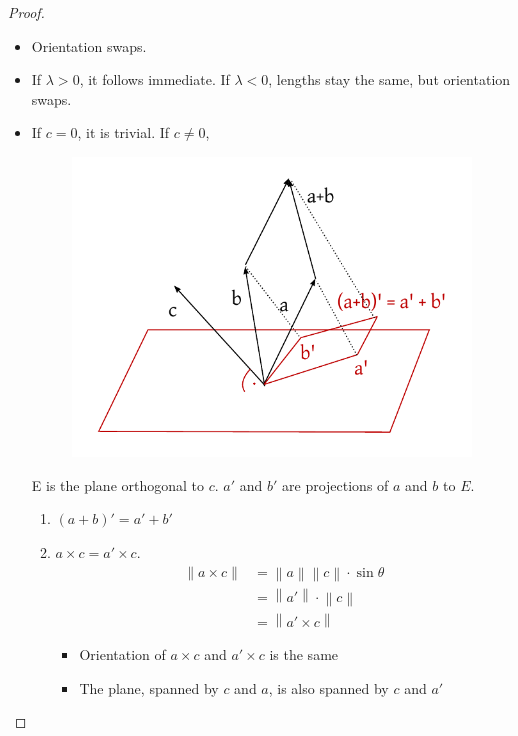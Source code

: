 \documentclass{article}
\newcommand{\norm}[1]{\left\|#1\right\|}
\begin{document}
\begin{proof}
  \begin{itemize}
    \item Orientation swaps.
    \item If $\lambda > 0$, it follows immediate.
      If $\lambda < 0$, lengths stay the same, but orientation swaps.
    \item If $c = 0$, it is trivial. If $c \neq 0$,
      \begin{figure}[!h]
        \begin{center}
          \includegraphics{img/04_apbmc_eq_amcpbmc.pdf}
        \end{center}
      \end{figure}
      E is the plane orthogonal to $c$. $a'$ and $b'$ are projections of $a$ and $b$ to $E$.

      \begin{enumerate}
        \item $(a+b)' = a' + b'$
        \item $a \times c = a' \times c$.
          \begin{align*}
            \norm{a \times c} &= \norm a \norm c \cdot \sin\theta \\
              &= \norm{a'} \cdot \norm{c} \\
              &= \norm{a' \times c}
          \end{align*}
          \begin{itemize}
            \item Orientation of $a \times c$ and $a' \times c$ is the same
            \item The plane, spanned by $c$ and $a$, is also spanned by $c$ and $a'$
          \end{itemize}


\end{enumerate}
\end{itemize}
\end{proof}
\end{document}
